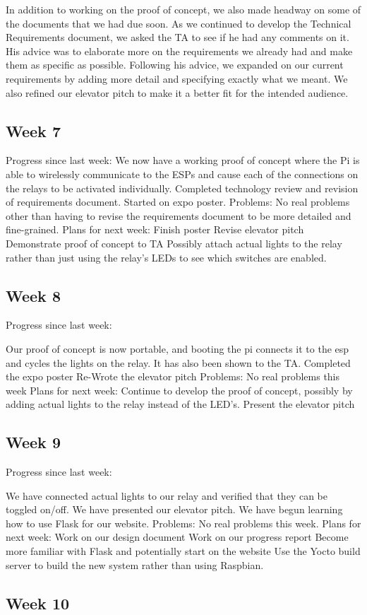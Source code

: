 \documentclass[letterpaper,10pt]{article}
\begin{document}
In addition to working on the proof of concept, we also made headway on some of the documents that we had due soon. As we continued to develop the Technical Requirements document, we asked the TA to see if he had any comments on it. His advice was to elaborate more on the requirements we already had and make them as specific as possible. Following his advice, we expanded on our current requirements by adding more detail and specifying exactly what we meant. We also refined our elevator pitch to make it a better fit for the intended audience.

\subsection{Week 7}
 
Progress since last week: 
We now have a working proof of concept where the Pi is able to wirelessly communicate to the ESPs and cause each of the connections on the relays to be activated individually. 
Completed technology review and revision of requirements document. 
Started on expo poster. 
Problems: 
No real problems other than having to revise the requirements document to be more detailed and fine-grained. 
Plans for next week: 
Finish poster 
Revise elevator pitch 
Demonstrate proof of concept to TA 
Possibly attach actual lights to the relay rather than just using the relay's LEDs to see which switches are enabled. 

\subsection{Week 8}
 
Progress since last week: 
 
Our proof of concept is now portable, and booting the pi connects it to the esp and cycles the lights on the relay. It has also been shown to the TA. 
Completed the expo poster 
Re-Wrote the elevator pitch 
Problems: 
No real problems this week 
Plans for next week: 
Continue to develop the proof of concept, possibly by adding actual lights to the relay instead of the LED's. 
Present the elevator pitch 

\subsection{Week 9}
 
Progress since last week: 
 
We have connected actual lights to our relay and verified that they can be toggled on/off. 
We have presented our elevator pitch. 
We have begun learning how to use Flask for our website. 
Problems: 
No real problems this week. 
Plans for next week: 
Work on our design document 
Work on our progress report 
Become more familiar with Flask and potentially start on the website 
Use the Yocto build server to build the new system rather than using Raspbian. 

\subsection{Week 10}
\end{document}
